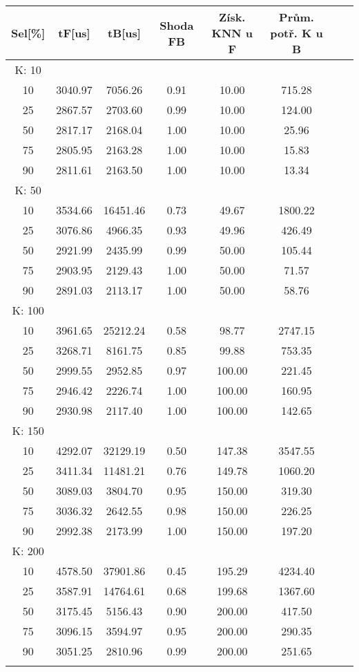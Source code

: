 \documentclass[czech,semestral,dept460,male,csharp,cpdeclaration]{diploma}
\begin{document}
		\begin{center}
			
			\begin{tabular}{c c c c c c c c}\label{FBC}
				
				Sel[\%] & tF[us] & tB[us] & Shoda FB & Získ. KNN u F & Prům. potř. K u B \\
				\midrule
			 	K: 10\\
			 	10 & 3040.97 & 7056.26 & 0.91 & 10.00 & 715.28\\
			 	25 & 2867.57 & 2703.60 & 0.99 & 10.00 & 124.00\\
			 	50 & 2817.17 & 2168.04 & 1.00 & 10.00 & 25.96\\
			 	75 & 2805.95 & 2163.28 & 1.00 & 10.00 & 15.83\\
			 	90 & 2811.61 & 2163.50 & 1.00 & 10.00 & 13.34\\
			 	K: 50\\
			 	10 & 3534.66 & 16451.46 & 0.73 & 49.67 & 1800.22\\
			 	25 & 3076.86 & 4966.35 & 0.93 & 49.96 & 426.49\\
			 	50 & 2921.99 & 2435.99 & 0.99 & 50.00 & 105.44\\
			 	75 & 2903.95 & 2129.43 & 1.00 & 50.00 & 71.57\\
			 	90 & 2891.03 & 2113.17 & 1.00 & 50.00 & 58.76\\
			 	K: 100\\
			 	10 & 3961.65 & 25212.24 & 0.58 & 98.77 & 2747.15\\
			 	25 & 3268.71 & 8161.75 & 0.85 & 99.88 & 753.35\\
			 	50 & 2999.55 & 2952.85 & 0.97 & 100.00 & 221.45\\
			 	75 & 2946.42 & 2226.74 & 1.00 & 100.00 & 160.95\\
			 	90 & 2930.98 & 2117.40 & 1.00 & 100.00 & 142.65\\
			 	K: 150\\
			 	10 & 4292.07 & 32129.19 & 0.50 & 147.38 & 3547.55\\
			 	25 & 3411.34 & 11481.21 & 0.76 & 149.78 & 1060.20\\
			 	50 & 3089.03 & 3804.70 & 0.95 & 150.00 & 319.30\\
			 	75 & 3036.32 & 2642.55 & 0.98 & 150.00 & 226.25\\
			 	90 & 2992.38 & 2173.99 & 1.00 & 150.00 & 197.20\\
			 	K: 200\\
			 	10 & 4578.50 & 37901.86 & 0.45 & 195.29 & 4234.40\\
			 	25 & 3587.91 & 14764.61 & 0.68 & 199.68 & 1367.60\\
			 	50 & 3175.45 & 5156.43 & 0.90 & 200.00 & 417.50\\
			 	75 & 3096.15 & 3594.97 & 0.95 & 200.00 & 290.35\\
			 	90 & 3051.25 & 2810.96 & 0.99 & 200.00 & 251.65\\
			 	\\
			\end{tabular}
			

\end{center}
\end{document}
